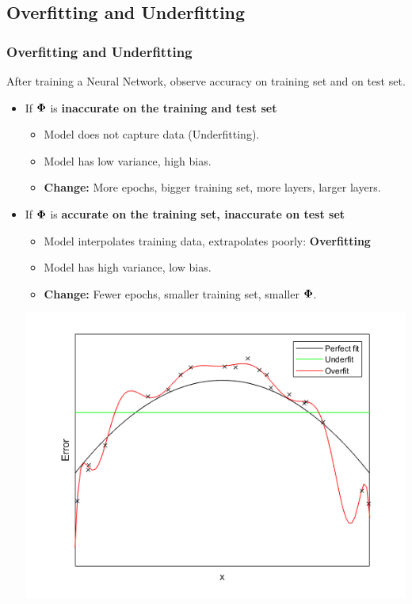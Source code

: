 \documentclass[10pt,hyperref={pdfpagelabels=false}]{beamer}
\begin{document}
\subsection{Overfitting and Underfitting}
\begin{frame}[allowframebreaks]
    \frametitle{Overfitting and Underfitting}
    After training a Neural Network, observe accuracy on training set and on test set.
    \begin{itemize}
        \item If $\boldsymbol{\Phi}$ is {\bf inaccurate on the training and test set}
        \begin{itemize}
            \item Model does not capture data (Underfitting).
            \item Model has low variance, high bias.
            \item {\bf Change:} More epochs, bigger training set, more layers, larger layers.
        \end{itemize}
        \item If $\boldsymbol{\Phi}$ is {\bf accurate on the training set, inaccurate on test set}
        \begin{itemize}
            \item Model interpolates training data, extrapolates poorly: {\bf Overfitting}
            \item Model has high variance, low bias.
            \item {\bf Change:} Fewer epochs, smaller training set, smaller $\boldsymbol{\Phi}$.
        \end{itemize}
    \framebreak
    \includegraphics[width=.9\textwidth]{figures/overunder1.png}

\end{itemize}
\end{frame}
\end{document}
